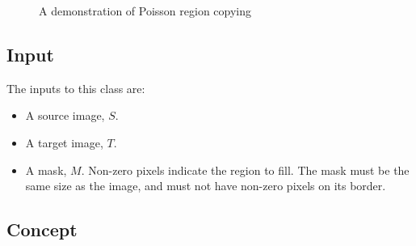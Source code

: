 \documentclass{InsightArticle}
\begin{document}
\begin{figure}[H]
\centering
{}
\caption{A demonstration of Poisson region copying}
\label{fig:RegionCopying}
\end{figure}

\subsection{Input}
The inputs to this class are:
\begin{itemize}
\item A source image, $S$.
\item A target image, $T$.
\item A mask, $M$. Non-zero pixels indicate the region to fill. The mask must be the same size as the image, and must not have non-zero pixels on its border.
\end{itemize}

\subsection{Concept}
\end{document}
